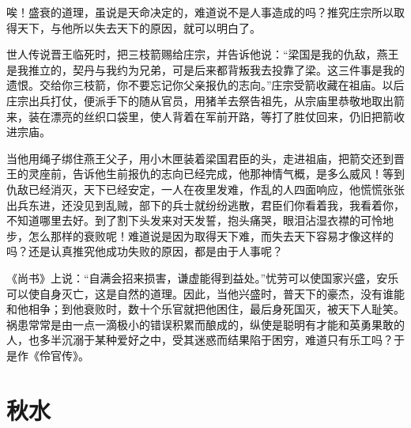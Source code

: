 \documentclass[12pt,UTF-8,openany,a4]{ctexbook}
\begin{document}
\begin{large}\yiwen
    
    唉！盛衰的道理，虽说是天命决定的，难道说不是人事造成的吗？推究庄宗所以取得天下，与他所以失去天下的原因，就可以明白了。
    
    世人传说晋王临死时，把三枝箭赐给庄宗，并告诉他说：“梁国是我的仇敌，燕王是我推立的，契丹与我约为兄弟，可是后来都背叛我去投靠了梁。这三件事是我的遗恨。交给你三枝箭，你不要忘记你父亲报仇的志向。”庄宗受箭收藏在祖庙。以后庄宗出兵打仗，便派手下的随从官员，用猪羊去祭告祖先，从宗庙里恭敬地取出箭来，装在漂亮的丝织口袋里，使人背着在军前开路，等打了胜仗回来，仍旧把箭收进宗庙。
    
    当他用绳子绑住燕王父子，用小木匣装着梁国君臣的头，走进祖庙，把箭交还到晋王的灵座前，告诉他生前报仇的志向已经完成，他那神情气概，是多么威风！等到仇敌已经消灭，天下已经安定，一人在夜里发难，作乱的人四面响应，他慌慌张张出兵东进，还没见到乱贼，部下的兵士就纷纷逃散，君臣们你看着我，我看着你，不知道哪里去好。到了割下头发来对天发誓，抱头痛哭，眼泪沾湿衣襟的可怜地步，怎么那样的衰败呢！难道说是因为取得天下难，而失去天下容易才像这样的吗？还是认真推究他成功失败的原因，都是由于人事呢？
    
    《尚书》上说：“自满会招来损害，谦虚能得到益处。”忧劳可以使国家兴盛，安乐可以使自身灭亡，这是自然的道理。因此，当他兴盛时，普天下的豪杰，没有谁能和他相争；到他衰败时，数十个乐官就把他困住，最后身死国灭，被天下人耻笑。祸患常常是由一点一滴极小的错误积累而酿成的，纵使是聪明有才能和英勇果敢的人，也多半沉溺于某种爱好之中，受其迷惑而结果陷于困穷，难道只有乐工吗？于是作《伶官传》。
    

\end{large}



\chapter{秋水}
\end{document}
